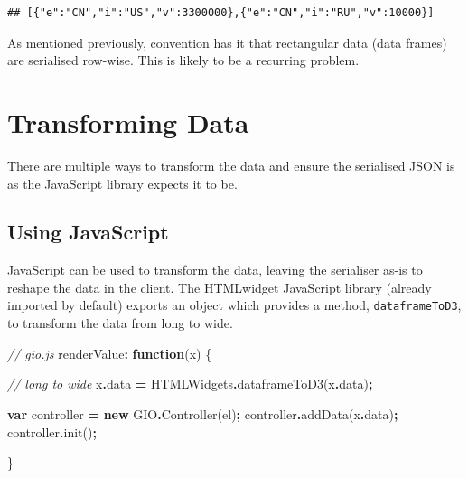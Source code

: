 \documentclass[
]{krantz}
\makeatletter
\newenvironment{Shaded}{\begin{snugshade}}{\end{snugshade}}
\newcommand{\AttributeTok}[1]{\textcolor[rgb]{0.61,0.61,0.61}{#1}}
\newcommand{\CommentTok}[1]{\textcolor[rgb]{0.37,0.37,0.37}{\textit{#1}}}
\newcommand{\FunctionTok}[1]{\textcolor[rgb]{0,0,0}{#1}}
\newcommand{\KeywordTok}[1]{\textcolor[rgb]{0.27,0.27,0.27}{\textbf{#1}}}
\newcommand{\NormalTok}[1]{#1}
\newcommand{\OperatorTok}[1]{\textcolor[rgb]{0.43,0.43,0.43}{\textbf{#1}}}
\newenvironment{kframe}{%
\medskip{}
\setlength{\fboxsep}{.8em}
 \def\at@end@of@kframe{}%
 \ifinner\ifhmode%
  \def\at@end@of@kframe{\end{minipage}}%
  \begin{minipage}{\columnwidth}%
 \fi\fi%
 \def\FrameCommand##1{\hskip\@totalleftmargin \hskip-\fboxsep
 \colorbox{shadecolor}{##1}\hskip-\fboxsep
     \hskip-\linewidth \hskip-\@totalleftmargin \hskip\columnwidth}%
 \MakeFramed {\advance\hsize-\width
   \@totalleftmargin\z@ \linewidth\hsize
   \@setminipage}}%
 {\par\unskip\endMakeFramed%
 \at@end@of@kframe}
\renewenvironment{Shaded}{\begin{kframe}}{\end{kframe}}
\makeatother
\begin{document}
\begin{verbatim}
## [{"e":"CN","i":"US","v":3300000},{"e":"CN","i":"RU","v":10000}]
\end{verbatim}

As mentioned previously, convention has it that rectangular data (data frames) are serialised row-wise. This is likely to be a recurring problem.

\hypertarget{widgets-full-transform-data}{%
\section{Transforming Data}\label{widgets-full-transform-data}}

There are multiple ways to transform the data and ensure the serialised JSON is as the JavaScript library expects it to be.

\hypertarget{widgets-full-transform-data-js}{%
\subsection{Using JavaScript}\label{widgets-full-transform-data-js}}

JavaScript can be used to transform the data, leaving the serialiser as-is to reshape the data in the client. The HTMLwidget JavaScript library (already imported by default) exports an object which provides a method, \texttt{dataframeToD3}, to transform the data from long to wide.

\begin{Shaded}
\begin{Highlighting}[]
\CommentTok{// gio.js}
\NormalTok{renderValue}\OperatorTok{:} \KeywordTok{function}\NormalTok{(x) \{}

  \CommentTok{// long to wide}
\NormalTok{  x}\OperatorTok{.}\AttributeTok{data} \OperatorTok{=}\NormalTok{ HTMLWidgets}\OperatorTok{.}\FunctionTok{dataframeToD3}\NormalTok{(x}\OperatorTok{.}\AttributeTok{data}\NormalTok{)}\OperatorTok{;}

  \KeywordTok{var}\NormalTok{ controller }\OperatorTok{=} \KeywordTok{new}\NormalTok{ GIO}\OperatorTok{.}\FunctionTok{Controller}\NormalTok{(el)}\OperatorTok{;}
\NormalTok{  controller}\OperatorTok{.}\FunctionTok{addData}\NormalTok{(x}\OperatorTok{.}\AttributeTok{data}\NormalTok{)}\OperatorTok{;} 
\NormalTok{  controller}\OperatorTok{.}\FunctionTok{init}\NormalTok{()}\OperatorTok{;}

\NormalTok{\}}
\end{Highlighting}
\end{Shaded}
\end{document}
